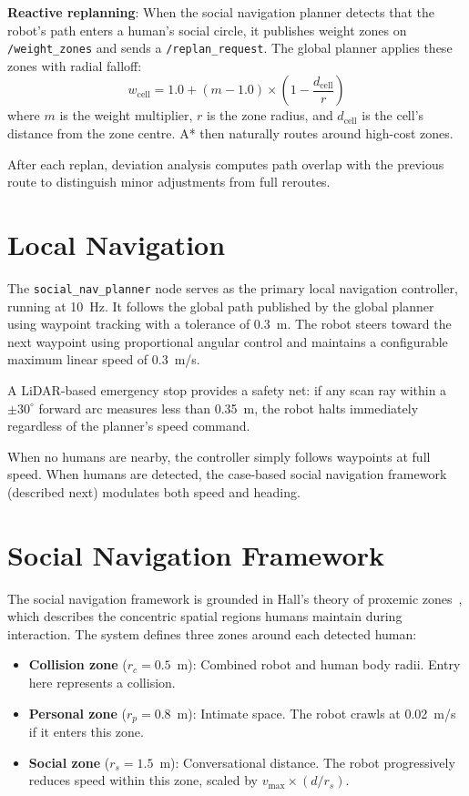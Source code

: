 \documentclass[a4paper]{article}
\begin{document}
\textbf{Reactive replanning}: When the social navigation planner detects that the robot's path enters a human's social circle, it publishes weight zones on \texttt{/weight\_zones} and sends a \texttt{/replan\_request}. The global planner applies these zones with radial falloff:
\begin{equation}
    w_{\text{cell}} = 1.0 + (m - 1.0) \times \left(1 - \frac{d_{\text{cell}}}{r}\right)
\end{equation}
where $m$ is the weight multiplier, $r$ is the zone radius, and $d_{\text{cell}}$ is the cell's distance from the zone centre. A* then naturally routes around high-cost zones.

After each replan, deviation analysis computes path overlap with the previous route to distinguish minor adjustments from full reroutes.


\section{Local Navigation}

The \texttt{social\_nav\_planner} node serves as the primary local navigation controller, running at 10~Hz. It follows the global path published by the global planner using waypoint tracking with a tolerance of 0.3~m. The robot steers toward the next waypoint using proportional angular control and maintains a configurable maximum linear speed of 0.3~m/s.

A LiDAR-based emergency stop provides a safety net: if any scan ray within a $\pm 30^\circ$ forward arc measures less than 0.35~m, the robot halts immediately regardless of the planner's speed command.

When no humans are nearby, the controller simply follows waypoints at full speed. When humans are detected, the case-based social navigation framework (described next) modulates both speed and heading.


\section{Social Navigation Framework}

The social navigation framework is grounded in Hall's theory of proxemic zones~\cite{hall1966hidden}, which describes the concentric spatial regions humans maintain during interaction. The system defines three zones around each detected human:

\begin{itemize}
    \item \textbf{Collision zone} ($r_c = 0.5$~m): Combined robot and human body radii. Entry here represents a collision.
    \item \textbf{Personal zone} ($r_p = 0.8$~m): Intimate space. The robot crawls at 0.02~m/s if it enters this zone.
    \item \textbf{Social zone} ($r_s = 1.5$~m): Conversational distance. The robot progressively reduces speed within this zone, scaled by $v_{\max} \times (d / r_s)$.
\end{itemize}
\end{document}
